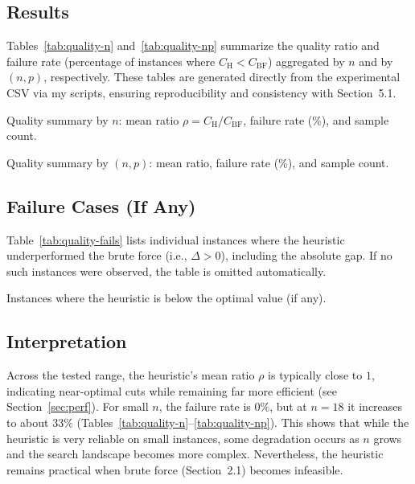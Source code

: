 \documentclass[12pt]{article}
\begin{document}
\subsection{Results}
Tables~\ref{tab:quality-n} and~\ref{tab:quality-np} summarize the quality ratio and failure rate (percentage of instances where $C_{\text{H}}<C_{\text{BF}}$) aggregated by $n$ and by $(n,p)$, respectively. These tables are generated directly from the experimental CSV via my scripts, ensuring reproducibility and consistency with Section~5.1.

\begin{table}[H]
\centering
\caption{Quality summary by $n$: mean ratio $\rho=C_{\text{H}}/C_{\text{BF}}$, failure rate (\%), and sample count.}
\label{tab:quality-n}

\end{table}

\begin{table}[H]
\centering
\caption{Quality summary by $(n,p)$: mean ratio, failure rate (\%), and sample count.}
\label{tab:quality-np}

\end{table}

\subsection{Failure Cases (If Any)}
Table~\ref{tab:quality-fails} lists individual instances where the heuristic underperformed the brute force (i.e., $\Delta>0$), including the absolute gap. If no such instances were observed, the table is omitted automatically.

\begin{table}[H]
\centering
\caption{Instances where the heuristic is below the optimal value (if any).}
\label{tab:quality-fails}
\end{table}

\subsection{Interpretation}
Across the tested range, the heuristic’s mean ratio $\rho$ is typically close to $1$, indicating near-optimal cuts while remaining far more efficient (see Section~\ref{sec:perf}). For small $n$, the failure rate is $0\%$, but at $n=18$ it increases to about $33\%$ (Tables~\ref{tab:quality-n}--\ref{tab:quality-np}). This shows that while the heuristic is very reliable on small instances, some degradation occurs as $n$ grows and the search landscape becomes more complex. Nevertheless, the heuristic remains practical when brute force (Section~2.1) becomes infeasible.
\end{document}
